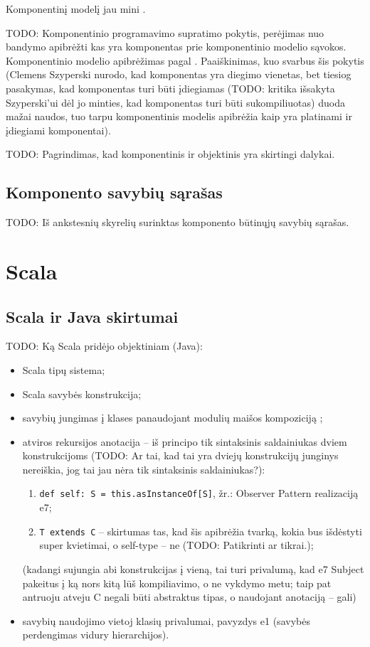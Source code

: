 Komponentinį modelį jau mini
\cite[4]{cs-beyond-object-oriented-programming}.

TODO: Komponentinio programavimo supratimo pokytis, perėjimas nuo
bandymo apibrėžti kas yra komponentas prie komponentinio modelio
sąvokos. Komponentinio modelio apibrėžimas pagal
\cite{classification-framework-for-scm}. Paaiškinimas, kuo svarbus šis
pokytis (Clemens Szyperski nurodo, kad komponentas yra diegimo
vienetas\cite{cs-beyond-object-oriented-programming}, bet tiesiog
pasakymas, kad komponentas turi būti įdiegiamas (TODO: kritika
išsakyta Szyperski'ui dėl jo minties, kad komponentas turi būti
sukompiliuotas) duoda mažai naudos, tuo tarpu komponentinis
modelis apibrėžia kaip yra platinami ir įdiegiami komponentai).

TODO: Pagrindimas, kad komponentinis ir objektinis yra skirtingi
dalykai.

\section{Komponento savybių sąrašas}

TODO: Iš ankstesnių skyrelių surinktas komponento būtinųjų savybių
sąrašas.

\chapter{Scala}

\section{Scala ir Java skirtumai}

TODO: Ką Scala pridėjo objektiniam (Java):
\begin{itemize}
  \item Scala tipų sistema;
  \item Scala savybės  konstrukcija;
  \item savybių jungimas į klases panaudojant modulių maišos
    kompoziciją ;
  \item atviros rekursijos anotacija  –
    iš principo tik sintaksinis saldainiukas dviem konstrukcijoms
    (TODO: Ar tai, kad tai yra dviejų konstrukcijų junginys nereiškia,
    jog tai jau nėra tik sintaksinis saldainiukas?):
    \begin{enumerate}
      \item \verb|def self: S = this.asInstanceOf[S]|, žr.: Observer
        Pattern realizaciją e7;
      \item \verb|T extends C| – skirtumas tas, kad šis apibrėžia
        tvarką, kokia bus išdėstyti super kvietimai, o self-type
        – ne (TODO: Patikrinti ar tikrai.);
    \end{enumerate}
    (kadangi sujungia abi konstrukcijas į vieną, tai turi privalumą, kad
    e7 Subject pakeitus į ką nors kitą lūš kompiliavimo, o ne vykdymo
    metu; taip pat antruoju atveju C negali būti abstraktus tipas, o
    naudojant anotaciją – gali)
  \item savybių naudojimo vietoj klasių privalumai, pavyzdys e1
    (savybės perdengimas vidury hierarchijos).
\end{itemize}

